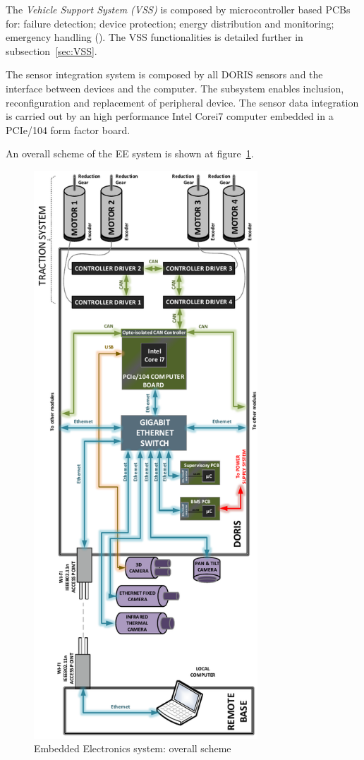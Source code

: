 \documentclass{ifacconf}
\begin{document}
The \emph{Vehicle Support System (VSS)} is composed by microcontroller based
PCBs for: failure detection; device protection; energy distribution and
monitoring; emergency handling (\cite{MARIUS}). The VSS
functionalities is detailed further in subsection~\ref{sec:VSS}.

The sensor integration system is composed by all DORIS sensors and the interface
between devices and the computer. The subsystem enables inclusion,
reconfiguration and replacement of peripheral device. The sensor data
integration is carried out by an high performance Intel\textregistered
Core\texttrademark i7 computer embedded in a PCIe/104 form factor board.

An overall scheme of the EE system is shown at figure~\ref{fig:EE-Communications}.
\begin{figure}
\begin{center}
\includegraphics[width=8.4cm]{figs/EE-Communications.pdf}    %
\caption{Embedded Electronics system: overall scheme}
\label{fig:EE-Communications}
\end{center}
\end{figure}
\end{document}

